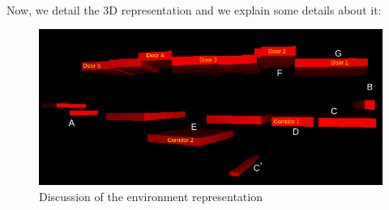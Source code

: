 \documentclass[12pt]{report}
\begin{document}
	\paragraph{}
	Now, we detail the 3D representation and we explain some details about it:
	\begin{figure}[H]
		\begin{center}
			\includegraphics[scale=0.90]{res/3D_recons_det.png}
			\caption{Discussion of the environment representation}
		\end{center}
	\end{figure}
\end{document}
